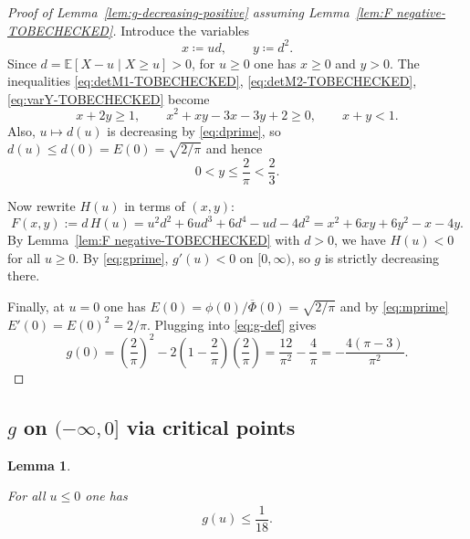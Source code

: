 \documentclass[11pt]{article}
\newtheorem{lemma}[theorem]{Lemma}
\begin{document}
\begin{proof}[Proof of Lemma~\ref{lem:g-decreasing-positive} assuming Lemma~\ref{lem:F negative-TOBECHECKED}]
Introduce the variables
\[
x\coloneqq u d,\qquad y\coloneqq d^2.
\]
Since $d=\mathbb{E}[X-u\mid X\ge u]>0$, for $u\ge 0$ one has $x\ge 0$ and $y>0$. The inequalities \eqref{eq:detM1-TOBECHECKED}, \eqref{eq:detM2-TOBECHECKED},
\eqref{eq:varY-TOBECHECKED} become
\begin{equation}\label{eq:constraints-TOBECHECKED}
x+2y\ge 1,\qquad
x^2+xy-3x-3y+2\ge 0,\qquad
x+y<1.
\end{equation}
Also, $u\mapsto d(u)$ is decreasing by \eqref{eq:dprime}, so $d(u)\le d(0)=E(0)=\sqrt{2/\pi}$ and hence
\begin{equation}\label{eq:ybound-TOBECHECKED}
0<y\le \frac{2}{\pi}<\frac{2}{3}.
\end{equation}

Now rewrite $H(u)$ in terms of $(x,y)$: 
\begin{equation}\label{eq:Hxy-TOBECHECKED}
 F(x,y):= d\,H(u)=u^2 d^2 + 6u d^3 + 6 d^4 - ud - 4d^2= x^2+6xy+6y^2-x-4y.
\end{equation}
By Lemma~\ref{lem:F negative-TOBECHECKED} with $d>0$, we have $H(u)<0$ for all $u\ge 0$. By \eqref{eq:gprime},
$g'(u)<0$ on $[0,\infty)$, so $g$ is strictly decreasing there.

Finally, at $u=0$ one has $E(0)=\phi(0)/\overline{\Phi}(0)=\sqrt{2/\pi}$ and by \eqref{eq:mprime}
$E'(0)=E(0)^2=2/\pi$. Plugging into \eqref{eq:g-def} gives
\begin{equation}\label{eq: g-zero-value-TOBECHECKED}
    g(0)=\left(\frac{2}{\pi}\right)^2-2\left(1-\frac{2}{\pi}\right)\left(\frac{2}{\pi}\right)
=\frac{12}{\pi^2}-\frac{4}{\pi}
=-\frac{4(\pi-3)}{\pi^2}.
\end{equation}

\end{proof}

\subsection{$g$ on $(-\infty,0]$ via critical points}

\begin{lemma}\label{lem:g-uniform-negative-TOBECHECKED}

For all $u\le 0$ one has
\[
g(u)\le \frac{1}{18}.
\]
\end{lemma}
\end{document}
